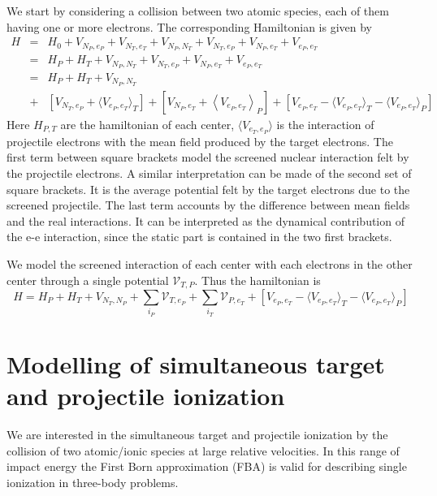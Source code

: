 We start by considering a collision between two atomic species, each of
them having one or more electrons. The corresponding Hamiltonian is
given by \autocite{Fiol2001JPBpL503}
\begin{eqnarray}\label{Q:simH1}
H &=& H_{0} + V_{N_{P},e_{P}} + V_{N_{T},e_{T}} +  V_{N_{P},N_{T}} +
V_{N_{T},e_{P}} + V_{N_{P},e_{T}} + V_{e_{P}, e_{T}} \nonumber \\
&=& H_{P} + H_{T} + V_{N_{P},N_{T}} + V_{N_{T},e_{P}} + V_{N_{P},e_{T}}
+
V_{e_{P}, e_{T}} \nonumber \\
&=& H_{P} + H_{T} + V_{N_{P},N_{T}}
\\
&+& \left[ V_{N_{T},e_{P}} + \langle V_{e_{P}, e_{T}} \rangle_{T}
\right] + \left[ V_{N_{P},e_{T}} + \left\langle V_{e_{P}, e_{T}}
\right\rangle_{P} \right] + \left[  V_{e_{P}, e_{T}} - \langle
V_{e_{P}, e_{T}} \rangle_{T} - \langle  V_{e_{P}, e_{T}} \rangle_{P}
\right] \nonumber
\end{eqnarray}
Here $H_{P,T}$ are the hamiltonian of each center, $\langle
V_{e_{T},e_{P}} \rangle $  is the interaction of projectile electrons
with the mean field produced by the target electrons. The first term
between square brackets model the screened nuclear interaction felt by
the projectile electrons. A similar interpretation can be made of the
second set of square brackets. It is the average potential felt by the
target electrons due to the screened projectile. The last term accounts
by the difference between mean fields and the real interactions. It can
be interpreted as the dynamical contribution of the e-e interaction,
since the static part is contained in the two first brackets.

We model the screened interaction of each center with each electrons in
the other center through a single potential $\mathcal{V}_{T,P}$. Thus
the hamiltonian is
\[
H = H_{P} + H_{T} + V_{N_{T},N_{P}} + \sum_{i_{P}}
\mathcal{V}_{T,e_{P}} + \sum_{i_{T}} \mathcal{V}_{P,e_{T}} + \left[
V_{e_{P}, e_{T}} - \langle V_{e_{P}, e_{T}} \rangle_{T} - \langle
V_{e_{P}, e_{T}} \rangle_{P} \right]
\]

\section{Modelling of simultaneous target and projectile ionization}


We are interested in the simultaneous target and projectile ionization
by the collision of two atomic/ionic species at large relative
velocities. In this range of impact energy the First Born approximation
(FBA) is valid for describing single ionization in three-body problems.

